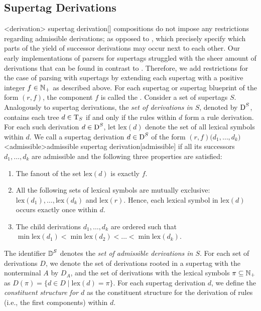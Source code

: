 \documentclass[../../document.tex]{subfiles}
\begin{document}
    \subsection*{ Supertag Derivations}
    <derivation>{ supertag derivation}[]
     compositions do not impose any restrictions regarding admissible derivations; as opposed to , which precisely specify which parts of the yield of successor derivations may occur next to each other.
    Our early implementations of parsers for  supertags struggled with the sheer amount of derivations that can be found in contrast to .
    Therefore, we add restrictions for the case of parsing with  supertags by extending each supertag with a positive integer \(f\in \mathbb{N}_+\) as described above.
    For each  supertag or  supertag blueprint of the form \((r,f)\), the component \(f\) is called the .
    Consider a set of  supertags \(S\).
    Analogously to  supertag derivations, the \emph{set of derivations in \(S\)}, denoted by \(\operatorname{D}^S\), contains each tree \(d \in \operatorname{T}_S\) if and only if the  rules within  \(d\) form a  rule derivation.
    For each such derivation \(d \in \operatorname{D}^S\), let \(\mathrm{lex}(d)\) denote the set of all lexical symbols within \(d\).
    We call a  supertag derivation \(d \in \operatorname{D}^S\) of the form \((r, f)\big(d_1, \ldots, d_k\big)\) <admissible>{admissible  supertag derivation}[admissible] if all its successors \(d_1, \ldots, d_k\) are admissible and the following three properties are satisfied:
    \begin{enumerate}
        \item The fanout of the set \(\mathrm{lex}(d)\) is exactly \(f\).
        \item All the following sets of lexical symbols are mutually exclusive: \(\mathrm{lex}(d_1), \ldots, \mathrm{lex}(d_k)\) and \(\mathrm{lex}(r)\). Hence, each lexical symbol in \(\mathrm{lex}(d)\) occurs exactly once within \(d\).
        \item\label{prop:dcp:admissible:order}
            The child derivations \(d_1, \ldots, d_k\) are ordered such that \(\min \mathrm{lex}(d_1) < \min \mathrm{lex}(d_2) < \ldots < \min \mathrm{lex}(d_k)\). 
    \end{enumerate}
    The identifier \(\operatorname{\mathbb{D}}^S\) denotes the \emph{set of admissible derivations in \(S\)}.
    For each set of derivations \(D\), we denote the set of derivations rooted in a supertag with the  nonterminal \(A\) by \(D_A\), and the set of derivations with the lexical symbols \(\pi\subseteq\mathbb{N}_+\) as \(D(\pi) = \{d \in D \mid \mathrm{lex}(d) = \pi\}\).
    For each  supertag derivation \(d\), we define the \emph{constituent structure for \(d\)} as the constituent structure for the derivation of  rules (i.e., the first components) within \(d\).
\end{document}
